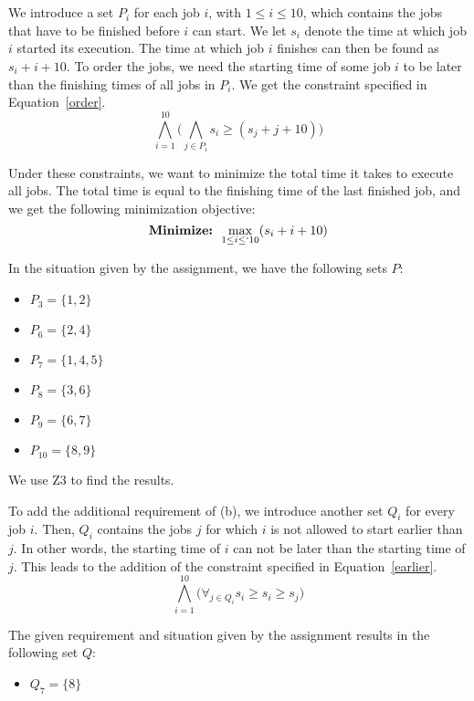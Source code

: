 \chapter{}\label{chp:3}
We introduce a set $P_i$ for each job $i$, with $1 \leq i \leq 10$, which contains the jobs that have to be finished before $i$ can start. We let $s_i$ denote the time at which job $i$ started its execution. The time at which job $i$ finishes can then be found as $s_i + i + 10$. To order the jobs, we need the starting time of some job $i$ to be later than the finishing times of all jobs in $P_i$. We get the constraint specified in Equation~\ref{order}.
\begin{equation}
    \label{order}
    \bigwedge^{10}_{i=1}\big(\bigwedge_{j\in P_i} s_i \geq (s_j + j + 10)\big)
\end{equation}

Under these constraints, we want to minimize the total time it takes to execute all jobs. The total time is equal to the finishing time of the last finished job, and we get the following minimization objective:
\begin{equation}
    \textbf{Minimize: }\max_{1\leq i \leq`10}(s_i + i + 10)
\end{equation}

In the situation given by the assignment, we have the following sets $P$:
\begin{itemize}
    \item $P_3 = \{1,2\}$
    \item $P_6 = \{2,4\}$
    \item $P_7 = \{1,4,5\}$
    \item $P_8 = \{3,6\}$
    \item $P_9 = \{6,7\}$
    \item $P_{10} = \{8,9\}$
\end{itemize}
We use Z3 to find the results.

To add the additional requirement of (b), we introduce another set $Q_i$ for every job $i$. Then, $Q_i$ contains the jobs $j$ for which $i$ is not allowed to start earlier than $j$. In other words, the starting time of $i$ can not be later than the starting time of $j$. This leads to the addition of the constraint specified in Equation~\ref{earlier}.
\begin{equation}
    \label{earlier}
    \bigwedge^{10}_{i=1}\big(\forall_{j\in Q_i} s_i \geq s_i \geq s_j \big)
\end{equation}

The given requirement and situation given by the assignment results in the following set $Q$:
\begin{itemize}
    \item $Q_7 = \{8\}$
\end{itemize}

